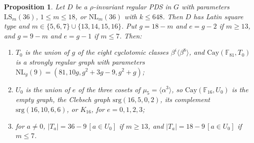 \documentclass[11pt]{amsart}
\newtheorem{proposition}[theorem]{Proposition}
\theoremstyle{definition}
\newcommand{\F}{\mathbb{F}}
\newcommand{\srg}{\mathrm{srg}}
\newcommand{\Cay}{\mathrm{Cay}}
\newcommand{\LS}{\mathrm{LS}}
\newcommand{\NL}{\mathrm{NL}}
\begin{document}
\begin{proposition}\label{prop:family}
Let $D$ be a $\rho$-invariant regular PDS in $G$ with parameters $\LS_m(36)$, $1\le m\le18$, or $\NL_m(36)$ with $k\le648$. Then $D$ has Latin square type and $m\in\{5,6,7\}\cup\{13,14,15,16\}$. Put $g=18-m$ and $e=g-2$ if $m\ge13$, and $g=9-m$ and $e=g-1$ if $m\le7$. Then:
\begin{enumerate}
\item[(a)] $T_0$ is the union of $g$ of the eight cyclotomic classes $\beta^i\langle\beta^8\rangle$, and $\Cay(\F_{81},T_0)$ is a strongly regular graph with parameters $\NL_g(9)=(81,10g,g^2+3g-9,g^2+g)$;
\item[(b)] $U_0$ is the union of $e$ of the three cosets of $\mu_5=\langle\alpha^3\rangle$, so $\Cay(\F_{16},U_0)$ is the empty graph, the Clebsch graph $\srg(16,5,0,2)$, its complement $\srg(16,10,6,6)$, or $K_{16}$, for $e=0,1,2,3$;
\item[(c)] for $a\ne0$, $|T_a|=36-9\,[a\in U_0]$ if $m\ge13$, and $|T_a|=18-9\,[a\in U_0]$ if $m\le7$.
\end{enumerate}
\end{proposition}
\end{document}
